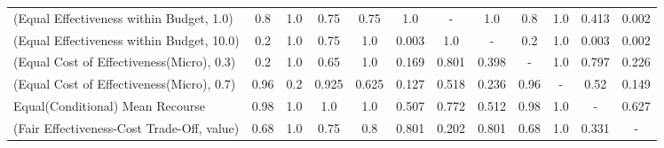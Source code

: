 \documentclass{article}
\begin{document}
\begin{table}[ht]
{\begin{tabular}{lccccccccccc}
(Equal Effectiveness within Budget, 1.0)   &                                       0.8 &                                       1.0 &                             0.75 &                             0.75 &                 1.0 &                                        - &                                       1.0 &                                       0.8 &                                       1.0 &                            0.413 &                                      0.002 \\
(Equal Effectiveness within Budget, 10.0)  &                                       0.2 &                                       1.0 &                             0.75 &                              1.0 &               0.003 &                                      1.0 &                                         - &                                       0.2 &                                       1.0 &                            0.003 &                                      0.002 \\
(Equal Cost of Effectiveness(Micro), 0.3)  &                                       0.2 &                                       1.0 &                             0.65 &                              1.0 &               0.169 &                                    0.801 &                                     0.398 &                                         - &                                       1.0 &                            0.797 &                                      0.226 \\
(Equal Cost of Effectiveness(Micro), 0.7)  &                                      0.96 &                                       0.2 &                            0.925 &                            0.625 &               0.127 &                                    0.518 &                                     0.236 &                                      0.96 &                                         - &                             0.52 &                                      0.149 \\
Equal(Conditional) Mean Recourse           &                                      0.98 &                                       1.0 &                              1.0 &                              1.0 &               0.507 &                                    0.772 &                                     0.512 &                                      0.98 &                                       1.0 &                                - &                                      0.627 \\
(Fair Effectiveness-Cost Trade-Off, value) &                                      0.68 &                                       1.0 &                             0.75 &                              0.8 &               0.801 &                                    0.202 &                                     0.801 &                                      0.68 &                                       1.0 &                            0.331 &                                          - \\
\bottomrule
\end{tabular}
}
\end{table}
\end{document}
